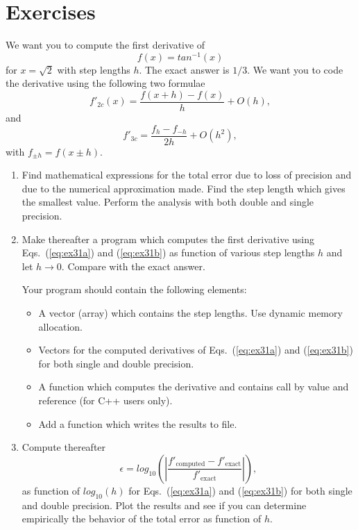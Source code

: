 \section{Exercises}
\begin{prob}
We want you to compute the first derivative of
\[
   f(x)=tan^{-1}(x) 
\]
for $x=\sqrt{2}$ with step lengths $h$. 
The exact answer is
$1/3$.
We want you to code the derivative using the following two
formulae 
\begin{equation}
    f'_{2c}(x)= \frac{f(x+h)-f(x)}{h}+O(h),
\label{eq:ex31a}
\end{equation}
and 
\begin{equation} 
   f'_{3c}=\frac{f_h-f_{-h}}{2h}+O(h^2),
\label{eq:ex31b}
\end{equation}
with $f_{\pm h}=f(x\pm h)$.



\begin{enumerate}
\item Find mathematical expressions for the total error due to loss
of precision and due to the numerical approximation made.
Find the step length which gives the smallest value.
Perform the analysis with both double and single precision.

\item Make thereafter a program 
which computes the first derivative using Eqs.~(\ref{eq:ex31a}) and (\ref{eq:ex31b}) 
as function of various step lengths $h$ and let $h\rightarrow 0$.
Compare with the exact answer.

Your program should contain the following elements:  
\begin{itemize}
 \item A vector (array)  which contains the step lengths. 
Use dynamic memory allocation.
 \item Vectors for the computed derivatives of Eqs.~(\ref{eq:ex31a}) and (\ref{eq:ex31b}) 
for both single and double precision.
\item A function which computes the derivative and contains call by value and reference 
(for C++ users only).

 \item Add a function which writes the results to file.
\end{itemize}
\item Compute thereafter
\[
   \epsilon=log_{10}\left(\left|\frac{f'_{\mathrm{computed}}-f'_{\mathrm{exact}}}
                 {f'_{\mathrm{exact}}}\right|\right),
\]
as function of  $log_{10}(h)$ for Eqs.~(\ref{eq:ex31a}) and (\ref{eq:ex31b})  
for both single and double precision.
Plot the results and see if you can determine empirically 
the behavior of the total error as function of $h$.
\end{enumerate}
\end{prob}


